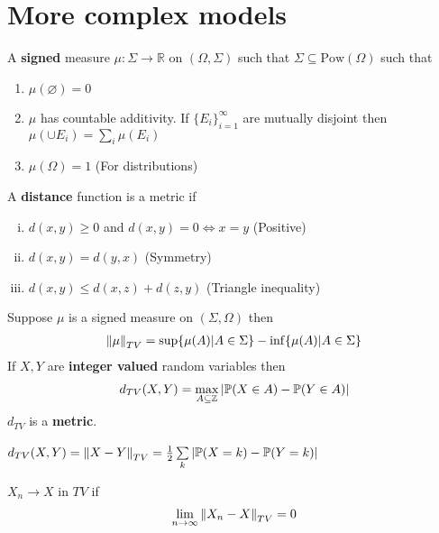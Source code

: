 \documentclass[12pt,a4paper]{article}
\begin{document}
\section{More complex models}
\begin{defn}[Measure]
A \textbf{signed} measure $\mu : \Sigma \to \mathbb{R}$ on $(\Omega, \Sigma)$ such that
$\Sigma \subseteq \mathrm{Pow}(\Omega)$ such that 
\begin{enumerate}[(1)]
\item $\mu(\varnothing) = 0$
\item $\mu$ has countable additivity. If $\{E_i\}_{i=1}^\infty$ are mutually disjoint then $\mu(\cup E_i) = \sum_i \mu(E_i)$
\item $\mu(\Omega) = 1$ (For distributions)
\end{enumerate}
\end{defn}
\begin{defn}[Metric]
A \textbf{distance} function is a metric if
\begin{enumerate}[(i)]
\item $d(x,y) \geq 0$ and $d(x,y) = 0 \iff x = y$ (Positive)
\item $d(x,y) = d(y,x)$ (Symmetry)
\item $d(x,y) \leq d(x,z) + d(z,y)$ (Triangle inequality)
\end{enumerate}

\end{defn}
\begin{defn}
Suppose $\mu$ is a signed measure on $(\Sigma, \Omega)$ then 
\begin{align*}
\norm{\mu}_{TV} = \sup\{\mu(A) | A\in \Sigma\} - \inf\{\mu(A) | A\in \Sigma\}
\end{align*}
If $X,Y$ are \textbf{integer valued} random variables then
\begin{align*}
d_{TV}(X,Y) = \max_{A\subseteq \mathbb{Z}}|\P(X\in A) - \P(Y\in A)|
\end{align*}
$d_{TV}$ is a \textbf{metric}.
\end{defn}
\begin{remark}
$d_{TV}(X,Y) = \norm{X-Y}_{TV} = \frac{1}{2}\nsum{k}{} |\P(X=k) - \P(Y=k)|$
\end{remark}
\begin{defn}
$X_n \to X$ in $TV$ if 
\begin{align*}
\nlim{n}{\infty} \norm{X_n - X}_{TV} = 0
\end{align*}
\end{defn}
\end{document}
